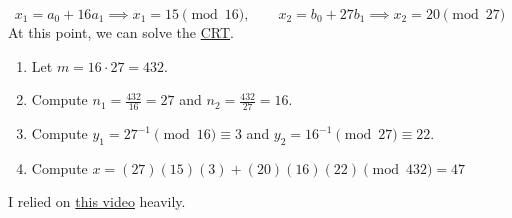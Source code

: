 {\[        x_{1} = a_{0} + 16a_{1} \implies x_{1} = 15 \pmod{16}, \qquad x_{2} = b_{0} + 27b_{1} \implies x_{2} = 20 \pmod{27}
    \]
    At this point, we can solve the \hyperref[thm:Chinese Remainder]{CRT}.
    \begin{enumerate}[label=\arabic*.]
        \item Let \(m = 16 \cdot 27 = 432\).
        \item Compute \(n_1 = \frac{432}{16} = 27\) and \(n_2 = \frac{432}{27} = 16\).
        \item Compute \(y_1 = 27^{-1} \pmod{16} \equiv 3\) and \(y_2 = 16^{-1} \pmod{27} \equiv 22\).
        \item Compute \(x = (27)(15)(3) + (20)(16)(22) \pmod{432} = 47\)
    \end{enumerate} I relied on \href{https://www.youtube.com/watch?v=CHfP5tBbiAg}{this video} heavily.
}